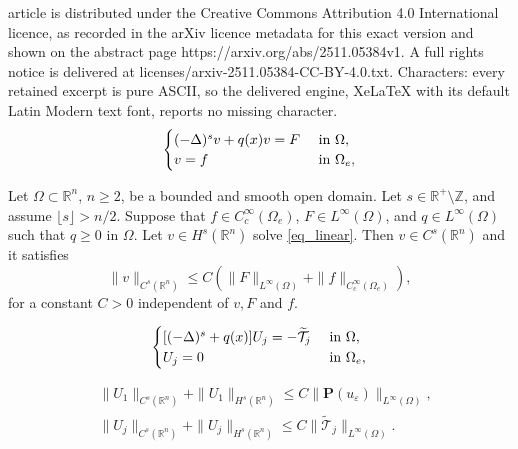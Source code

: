 \documentclass[10pt,a4paper]{amsart}
\newcommand{\LC}{\left(}
\newcommand{\RC}{\right)}
\newcommand{\R}{\mathbb{R}}
\newcommand{\floor}[1]{\lfloor #1 \rfloor}
\begin{document}
article is distributed under the Creative Commons Attribution 4.0 International licence, as recorded in the arXiv licence metadata for this exact version and shown on the abstract page https://arxiv.org/abs/2511.05384v1. A full rights notice is delivered at licenses/arxiv-2511.05384-CC-BY-4.0.txt. Characters: every retained excerpt is pure ASCII, so the delivered engine, XeLaTeX with its default Latin Modern text font, reports no missing character.
\begin{equation}\label{eq_linear}
\begin{cases}
(-\Delta)^s v + q(x)v = F &\hbox{ in } \Omega,\\
v = f &\hbox{ in } \Omega_e,
\end{cases}
\end{equation}

\begin{prop}\label{prop_Holder_linear}
Let $\Omega\subset\R^n$, $n\geq 2$, be a bounded and smooth open domain. Let $s\in \R^+\setminus \mathbb{Z}$, and assume $\floor{s}>n/2$. Suppose that $f\in C_c^\infty(\Omega_e)$, $F\in L^\infty(\Omega)$, and  
$q\in L^\infty(\Omega)$ such that $q\ge 0$ in $\Omega$.
Let $v\in H^s(\R^n)$ solve \eqref{eq_linear}.
Then $v\in C^{s}(\R^n)$ and it satisfies
\[
\|v\|_{C^{s}(\R^n)}
\le
C \LC  \|F\|_{L^\infty(\Omega)}+ \|f\|_{C_c^\infty(\Omega_e)} \RC,
\]
for a constant $C>0$ independent of $v, F$ and $f$. 
\end{prop}

\begin{align}\label{EQU_U general}
\begin{cases}
[(-\Delta)^s +q(x) ]U_j  = -\widetilde{\mathcal{T}}_j &\hbox{ in } \Omega,\\
U_j = 0 &\hbox{ in } \Omega_e,
\end{cases}
\end{align}

\begin{equation}\label{EST:U_j}  
\begin{aligned}
&\|U_1\|_{C^s(\R^n)}+\|U_1\|_{H^s(\R^n)}
\le  C\|\mathbf{P}(u_\varepsilon) \|_{L^\infty(\Omega)},\\
&\|U_j\|_{C^s(\R^n)}+\|U_j\|_{H^s(\R^n)}
\le  C\|\widetilde{\mathcal{T}}_{j}\|_{L^\infty(\Omega)}. 
\end{aligned}
\end{equation}
\end{document}
